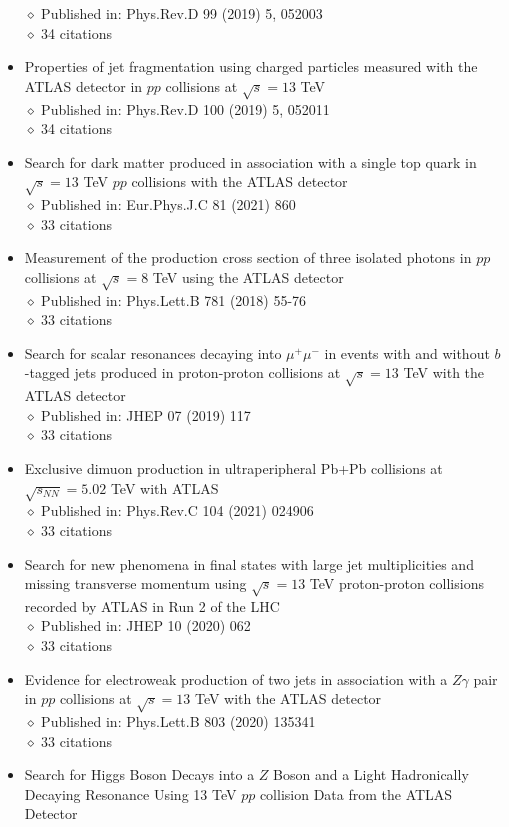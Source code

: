 \documentclass[margin, 10pt]{res} %
\begin{document}
\begin{resume}
\begin{itemize}
$\diamond$ Published in: Phys.Rev.D 99 (2019) 5, 052003\\
$\diamond$ 34 citations
\item Properties of jet fragmentation using charged particles measured with the ATLAS detector in $pp$ collisions at $\sqrt{s} = 13$ TeV\\
$\diamond$ Published in: Phys.Rev.D 100 (2019) 5, 052011\\
$\diamond$ 34 citations
\item Search for dark matter produced in association with a single top quark in $\sqrt{s} = 13$ TeV $pp$ collisions with the ATLAS detector\\
$\diamond$ Published in: Eur.Phys.J.C 81 (2021) 860\\
$\diamond$ 33 citations
\item Measurement of the production cross section of three isolated photons in $pp$ collisions at $\sqrt{s} = 8$ TeV using the ATLAS detector\\
$\diamond$ Published in: Phys.Lett.B 781 (2018) 55-76\\
$\diamond$ 33 citations
\item Search for scalar resonances decaying into $\mu^{+}\mu^{-}$ in events with and without $b$-tagged jets produced in proton-proton collisions at $\sqrt{s} = 13$ TeV with the ATLAS detector\\
$\diamond$ Published in: JHEP 07 (2019) 117\\
$\diamond$ 33 citations
\item Exclusive dimuon production in ultraperipheral Pb+Pb collisions at $\sqrt{s_{NN}} = 5.02$ TeV with ATLAS\\
$\diamond$ Published in: Phys.Rev.C 104 (2021) 024906\\
$\diamond$ 33 citations
\item Search for new phenomena in final states with large jet multiplicities and missing transverse momentum using $\sqrt{s} = 13$ TeV proton-proton collisions recorded by ATLAS in Run 2 of the LHC\\
$\diamond$ Published in: JHEP 10 (2020) 062\\
$\diamond$ 33 citations
\item Evidence for electroweak production of two jets in association with a $Z\gamma$ pair in $pp$ collisions at $\sqrt{s} = 13$ TeV with the ATLAS detector\\
$\diamond$ Published in: Phys.Lett.B 803 (2020) 135341\\
$\diamond$ 33 citations
\item Search for Higgs Boson Decays into a $Z$ Boson and a Light Hadronically Decaying Resonance Using 13 TeV $pp$ collision Data from the ATLAS Detector\\

\end{itemize}
\end{resume}
\end{document}
